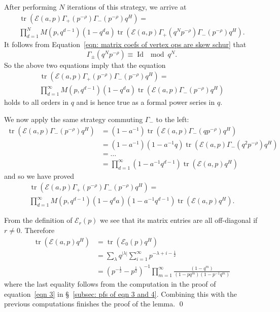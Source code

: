 \documentclass[12pt]{amsart}
\newcommand{\half}{\frac{1}{2}}
\theoremstyle{definition}
\newcommand{\tr}{\operatorname{tr}}
\newcommand{\E}{\mathcal{E}}
\newcommand{\ptotheminusrho}{p^{-\rho}}
\begin{document}
After performing $N$ iterations of this strategy, we arrive at
\begin{multline*}
 \tr (\E (a,p)\Gamma_{+}(\ptotheminusrho)\Gamma_{-}(\ptotheminusrho
)q^{H}) = \\
\prod_{d=1}^{N}M(p,q^{d-1})(1-q^{d}a) \tr (\E (a,p)\Gamma_{+}(q^{N}\ptotheminusrho)\Gamma_{-}(\ptotheminusrho
)q^{H}).
\end{multline*}
It follows from Equation~\eqref{eqn: matrix coefs of vertex ops are
skew schur} that 
\[
\Gamma_{\pm}(q^{N}\ptotheminusrho )\equiv \operatorname{Id} \mod q^{N}.
\]
So the above two equations imply that the equation
\begin{multline*}
 \tr (\E (a,p)\Gamma_{+}(\ptotheminusrho)\Gamma_{-}(\ptotheminusrho
)q^{H}) = \\
\prod_{d=1}^{\infty }M(p,q^{d-1})(1-q^{d}a) \tr (\E (a,p)\Gamma_{-}(\ptotheminusrho
)q^{H})
\end{multline*}
holds to all orders in $q$ and is hence true as a formal power series
in $q$.

We now apply the same strategy commuting $\Gamma_{-}$ to the left:
\begin{align*}
\tr (\E (a,p)\Gamma_{-}(\ptotheminusrho )q^{H}) &=(1-a^{-1})\tr (\E (a,p)\Gamma_{-}(q\ptotheminusrho )q^{H}) \\
&=(1-a^{-1})(1-a^{-1}q)\tr (\E (a,p)\Gamma_{-}(q^{2}\ptotheminusrho )q^{H}) \\
&=\dots \\
&=\prod_{d=1}^{\infty}(1-a^{-1}q^{d-1})\tr (\E (a,p)q^{H})
\end{align*}
and so we have proved
\begin{multline*}
 \tr (\E (a,p)\Gamma_{+}(\ptotheminusrho)\Gamma_{-}(\ptotheminusrho
)q^{H}) = \\
\prod_{d=1}^{\infty }M(p,q^{d-1})(1-q^{d}a)(1-a^{-1}q^{d-1})\tr (\E (a,p)q^{H}).
\end{multline*}


From the definition of $\E_{r}(p)$ we see that its matrix entries are
all off-diagonal if $r\neq 0$. Therefore
\begin{align*}
\tr (\E (a,p) q^{H})&=\tr (\E_{0}(p)q^{H})\\
&= \sum_{\lambda} q^{|\lambda |}\sum_{i=1}^{\infty}p^{-\lambda +i-\half}\\
&=(p^{-\half}-p^{\half})^{-1}\prod_{m=1}^{\infty} \frac{(1-q^{m})}{(1-pq^{m})(1-p^{-1}q^{m})}
\end{align*}
where the last equality follows from the computation in the proof of
equation~\eqref{eqn 3} in \S~\ref{subsec: pfs of eqn 3 and
4}. Combining this with the previous computations finishes the proof
of the lemma. \qed
\end{document}
